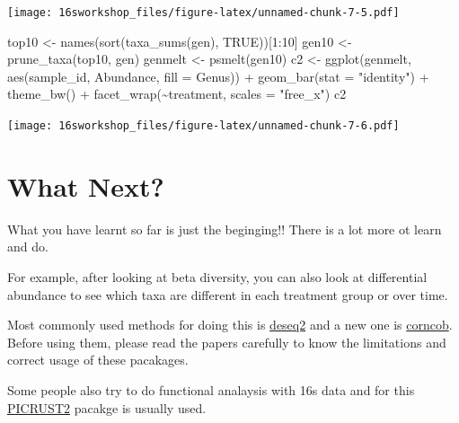 \documentclass[
]{book}
\newenvironment{Shaded}{\begin{snugshade}}{\end{snugshade}}
\newcommand{\AttributeTok}[1]{\textcolor[rgb]{0.77,0.63,0.00}{#1}}
\newcommand{\ConstantTok}[1]{\textcolor[rgb]{0.00,0.00,0.00}{#1}}
\newcommand{\DecValTok}[1]{\textcolor[rgb]{0.00,0.00,0.81}{#1}}
\newcommand{\FunctionTok}[1]{\textcolor[rgb]{0.00,0.00,0.00}{#1}}
\newcommand{\NormalTok}[1]{#1}
\newcommand{\OtherTok}[1]{\textcolor[rgb]{0.56,0.35,0.01}{#1}}
\newcommand{\SpecialCharTok}[1]{\textcolor[rgb]{0.00,0.00,0.00}{#1}}
\newcommand{\StringTok}[1]{\textcolor[rgb]{0.31,0.60,0.02}{#1}}
\begin{document}
\texttt{[image: 16sworkshop\_files/figure-latex/unnamed-chunk-7-5.pdf]}

\begin{Shaded}
\begin{Highlighting}[]
\NormalTok{top10 }\OtherTok{\textless{}{-}} \FunctionTok{names}\NormalTok{(}\FunctionTok{sort}\NormalTok{(}\FunctionTok{taxa\_sums}\NormalTok{(gen), }\ConstantTok{TRUE}\NormalTok{))[}\DecValTok{1}\SpecialCharTok{:}\DecValTok{10}\NormalTok{]}
\NormalTok{gen10 }\OtherTok{\textless{}{-}} \FunctionTok{prune\_taxa}\NormalTok{(top10, gen)}
\NormalTok{genmelt }\OtherTok{\textless{}{-}} \FunctionTok{psmelt}\NormalTok{(gen10)}
\NormalTok{c2 }\OtherTok{\textless{}{-}} \FunctionTok{ggplot}\NormalTok{(genmelt, }\FunctionTok{aes}\NormalTok{(sample\_id, Abundance, }\AttributeTok{fill =}\NormalTok{ Genus)) }\SpecialCharTok{+}
  \FunctionTok{geom\_bar}\NormalTok{(}\AttributeTok{stat =} \StringTok{"identity"}\NormalTok{) }\SpecialCharTok{+}
  \FunctionTok{theme\_bw}\NormalTok{() }\SpecialCharTok{+}
  \FunctionTok{facet\_wrap}\NormalTok{(}\SpecialCharTok{\textasciitilde{}}\NormalTok{treatment, }\AttributeTok{scales =} \StringTok{"free\_x"}\NormalTok{)}
\NormalTok{c2}
\end{Highlighting}
\end{Shaded}

\texttt{[image: 16sworkshop\_files/figure-latex/unnamed-chunk-7-6.pdf]}

\hypertarget{what-next}{%
\chapter{What Next?}\label{what-next}}

What you have learnt so far is just the beginging!! There is a lot more ot learn and do.

For example, after looking at beta diversity, you can also look at differential abundance to see which taxa are different in each treatment group or over time.

Most commonly used methods for doing this is \href{https://bioconductor.org/packages/release/bioc/html/DESeq2.html}{deseq2} and a new one is \href{https://github.com/bryandmartin/corncob/}{corncob}. Before using them, please read the papers carefully to know the limitations and correct usage of these pacakages.

Some people also try to do functional analaysis with 16s data and for this \href{https://github.com/picrust/picrust2/wiki}{PICRUST2} pacakge is usually used.

  
\end{document}
